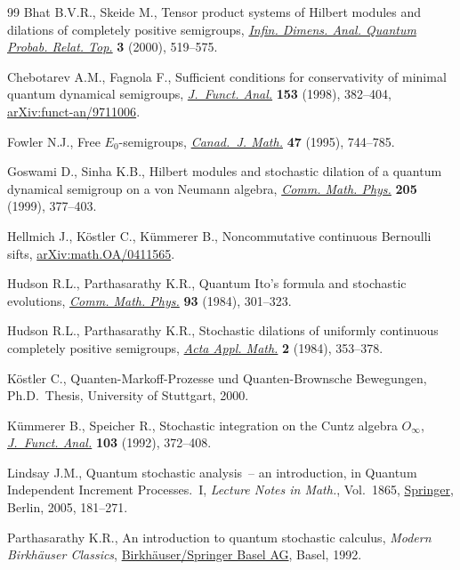 \documentclass[pdftex]{sigma}%
\numberwithin{equation}{section}
\begin{document}
\begin{thebibliography}{99}
Bhat B.V.R., Skeide M., Tensor product systems of {H}ilbert modules and
 dilations of completely positive semigroups, \href{https://doi.org/10.1142/S0219025700000261}{\textit{Infin. Dimens. Anal.
 Quantum Probab. Relat. Top.}} \textbf{3} (2000), 519--575.

Chebotarev A.M., Fagnola F., Sufficient conditions for conservativity of
 minimal quantum dynamical semigroups, \href{https://doi.org/10.1006/jfan.1997.3189}{\textit{J.~Funct. Anal.}} \textbf{153}
 (1998), 382--404, \href{https://arxiv.org/abs/funct-an/9711006}{arXiv:funct-an/9711006}.

Fowler N.J., Free {$E_0$}-semigroups, \href{https://doi.org/10.4153/CJM-1995-039-0}{\textit{Canad.~J. Math.}} \textbf{47}
 (1995), 744--785.

Goswami D., Sinha K.B., Hilbert modules and stochastic dilation of a quantum
 dynamical semigroup on a von {N}eumann algebra, \href{https://doi.org/10.1007/s002200050682}{\textit{Comm. Math. Phys.}}
 \textbf{205} (1999), 377--403.

Hellmich J., K\"ostler C., K\"ummerer B., Noncommutative continuous Bernoulli
 sifts, \href{https://arxiv.org/abs/math.OA/0411565}{arXiv:math.OA/0411565}.

Hudson R.L., Parthasarathy K.R., Quantum {I}to's formula and stochastic
 evolutions, \href{https://doi.org/10.1007/BF01258530}{\textit{Comm. Math. Phys.}} \textbf{93} (1984), 301--323.

Hudson R.L., Parthasarathy K.R., Stochastic dilations of uniformly continuous
 completely positive semigroups, \href{https://doi.org/10.1007/BF02280859}{\textit{Acta Appl. Math.}} \textbf{2} (1984),
 353--378.

K\"ostler C., Quanten-Markoff-Prozesse und Quanten-Brownsche Bewegungen, Ph.D.~Thesis, {U}niversity of Stuttgart, 2000.

K\"ummerer B., Speicher R., Stochastic integration on the {C}untz algebra
 {$O_\infty$}, \href{https://doi.org/10.1016/0022-1236(92)90126-4}{\textit{J.~Funct. Anal.}} \textbf{103} (1992), 372--408.

Lindsay J.M., Quantum stochastic analysis~-- an introduction, in Quantum
 Independent Increment Processes.~{I}, \textit{Lecture Notes in Math.}, Vol.~1865, \href{https://doi.org/10.1007/11376569_3}{Springer}, Berlin, 2005, 181--271.

Parthasarathy K.R., An introduction to quantum stochastic calculus, \textit{Modern
 Birkh\"auser Classics}, \href{https://doi.org/10.1007/978-3-0348-0566-7}{Birkh\"auser/Springer Basel AG}, Basel, 1992.


\end{thebibliography}
\end{document}
